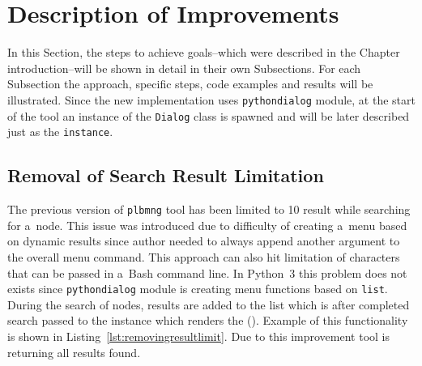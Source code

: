 \section{Description of Improvements}
\label{section:implementapproach}
In this Section, the steps to achieve goals--which were described in the Chapter introduction--will be shown in detail in their own Subsections. For each Subsection the approach, specific steps, code examples and results will be illustrated. Since the new implementation uses \texttt{pythondialog} module, at the start of the tool an instance of the \texttt{Dialog} class is spawned and will be later described just as the \texttt{instance}.
\subsection{Removal of Search Result Limitation}
The previous version of \texttt{plbmng} tool has been limited to 10 result while searching for a~node. This issue was introduced due to difficulty of creating a~menu based on dynamic results since author needed to always append another argument to the overall menu command. This approach can also hit limitation of characters that can be passed in a~Bash command line. In Python~3 this problem does not exists since \texttt{pythondialog} module is creating menu functions based on \texttt{list}. During the search of nodes, results are added to the list which is after completed search passed to the instance which renders the  (). Example of this functionality is shown in Listing~\ref{lst:removingresultlimit}. Due to this improvement tool is returning all results found.

